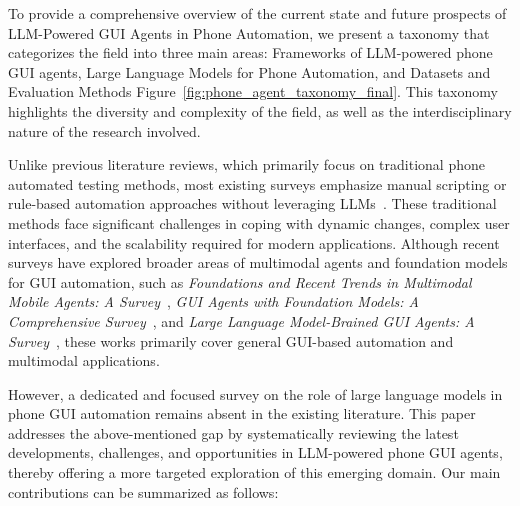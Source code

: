 To provide a comprehensive overview of the current state and future prospects of LLM-Powered GUI Agents in Phone Automation, we present a taxonomy that categorizes the field into three main areas: Frameworks of LLM-powered phone GUI agents, Large Language Models for Phone Automation, and Datasets and Evaluation Methods Figure~\ref{fig:phone_agent_taxonomy_final}. This taxonomy highlights the diversity and complexity of the field, as well as the interdisciplinary nature of the research involved.


% 




Unlike previous literature reviews, which primarily focus on traditional phone automated testing methods, most existing surveys emphasize manual scripting or rule-based automation approaches without leveraging LLMs~\cite{arnatovich2018systematic,deshmukh2023automated,nass2024overcoming,nass2021many,tramontana2019automated}. These traditional methods face significant challenges in coping with dynamic changes, complex user interfaces, and the scalability required for modern applications. Although recent surveys have explored broader areas of multimodal agents and foundation models for GUI automation, such as \textit{Foundations and Recent Trends in Multimodal Mobile Agents: A Survey}~\cite{wu2024foundations}, \textit{GUI Agents with Foundation Models: A Comprehensive Survey}~\cite{wang2024gui}, and \textit{Large Language Model-Brained GUI Agents: A Survey}~\cite{zhang2024large}, these works primarily cover general GUI-based automation and multimodal applications.

However, a dedicated and focused survey on the role of large language models in phone GUI automation remains absent in the existing literature. This paper addresses the above-mentioned gap by systematically reviewing the latest developments, challenges, and opportunities in LLM-powered phone GUI agents, thereby offering a more targeted exploration of this emerging domain. Our main contributions can be summarized as follows:

